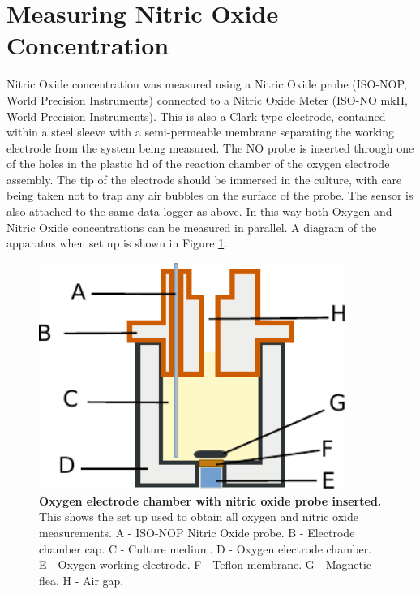 \section{Measuring Nitric Oxide Concentration}
Nitric Oxide concentration was measured using a Nitric Oxide probe (ISO-NOP, World Precision Instruments) connected to a Nitric Oxide Meter (ISO-NO mkII, World Precision Instruments). This is also a Clark type electrode, contained within a steel sleeve with a semi-permeable membrane separating the working electrode from the system being measured\cite{Liu2005,Bedioui2003,Serpe2007}. The NO probe is inserted through one of the holes in the plastic lid of the reaction chamber of the oxygen electrode assembly. The tip of the electrode should be immersed in the culture, with care being taken not to trap any air bubbles on the surface of the probe. The sensor is also attached to the same data logger as above. In this way both Oxygen and Nitric Oxide concentrations can be measured in parallel. A diagram of the apparatus when set up is shown in Figure \ref{fig:electrode_chamber}.

\begin{figure}[tbp]
 \begin{center}
 \includegraphics[width=10cm]{./02-materialsmethods/data/electrode_chamber.pdf}
 \caption[Oxygen electrode chamber with nitric oxide probe inserted]{{\bf Oxygen electrode chamber with nitric oxide probe inserted.} This shows the set up used to obtain all oxygen and nitric oxide measurements. A - ISO-NOP Nitric Oxide probe. B - Electrode chamber cap. C - Culture medium. D - Oxygen electrode chamber. E - Oxygen working electrode. F - Teflon\texttrademark{} membrane. G - Magnetic flea. H - Air gap.
 \label{fig:electrode_chamber}}
 \end{center}
\end{figure}


